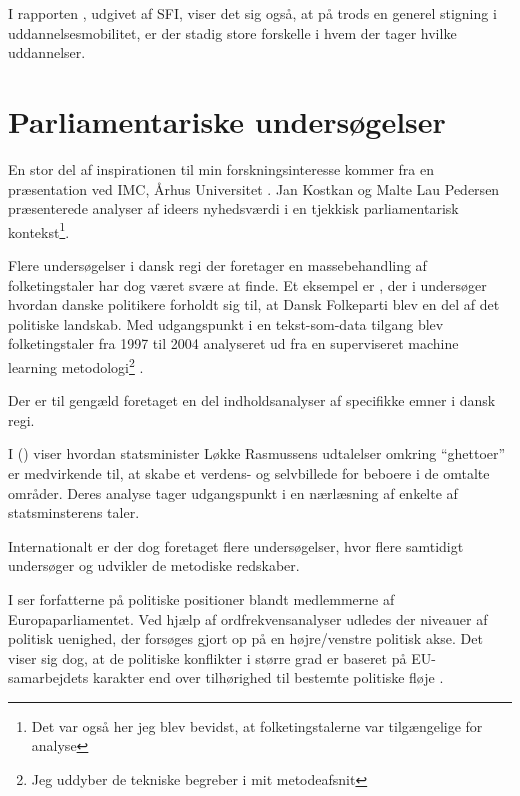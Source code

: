 I rapporten , udgivet af SFI, viser det sig også, at på trods en generel stigning i uddannelsesmobilitet, er der stadig store forskelle i hvem der tager hvilke uddannelser.

\section{Parliamentariske undersøgelser}\label{sec:review-parl}

En stor del af inspirationen til min forskningsinteresse kommer fra en præsentation ved IMC, Århus Universitet \autocite{interactingmindscentreaarhusuniversityNLPWorkshopIMC2019}. Jan Kostkan og Malte Lau Pedersen præsenterede analyser af ideers nyhedsværdi i en tjekkisk parliamentarisk kontekst\footnote{Det var også her jeg blev bevidst, at folketingstalerne var tilgængelige for analyse}.

Flere undersøgelser i dansk regi der foretager en massebehandling af folketingstaler har dog været svære at finde.
Et eksempel er \citeauthor{hjorthEstablishmentResponsesPopulist2018}, der i  undersøger hvordan danske politikere forholdt sig til, at Dansk Folkeparti blev en del af det politiske landskab.
Med udgangspunkt i en tekst-som-data tilgang blev folketingstaler fra 1997 til 2004 analyseret ud fra en superviseret machine learning metodologi\footnote{Jeg uddyber de tekniske begreber i mit metodeafsnit} \autocite{hjorthEstablishmentResponsesPopulist2018}.

Der er til gengæld foretaget en del indholdsanalyser af specifikke emner i dansk regi.

I  (\citeyear{andersenTaenkIkkePa2012}) viser \citeauthor{andersenTaenkIkkePa2012} hvordan statsminister Løkke Rasmussens udtalelser omkring “ghettoer” er medvirkende til, at skabe et verdens- og selvbillede for beboere i de omtalte områder.
Deres analyse tager udgangspunkt i en nærlæsning af enkelte af statsminsterens taler.

Internationalt er der dog foretaget flere undersøgelser, hvor flere samtidigt undersøger og udvikler de metodiske redskaber.

I  ser forfatterne på politiske positioner blandt medlemmerne af Europaparliamentet.
Ved hjælp af ordfrekvensanalyser udledes der niveauer af politisk uenighed, der forsøges gjort op på en højre/venstre politisk akse.
Det viser sig dog, at de politiske konflikter i større grad er baseret på EU-samarbejdets karakter end over tilhørighed til bestemte politiske fløje \autocite{prokschPositionTakingEuropean2010}.

